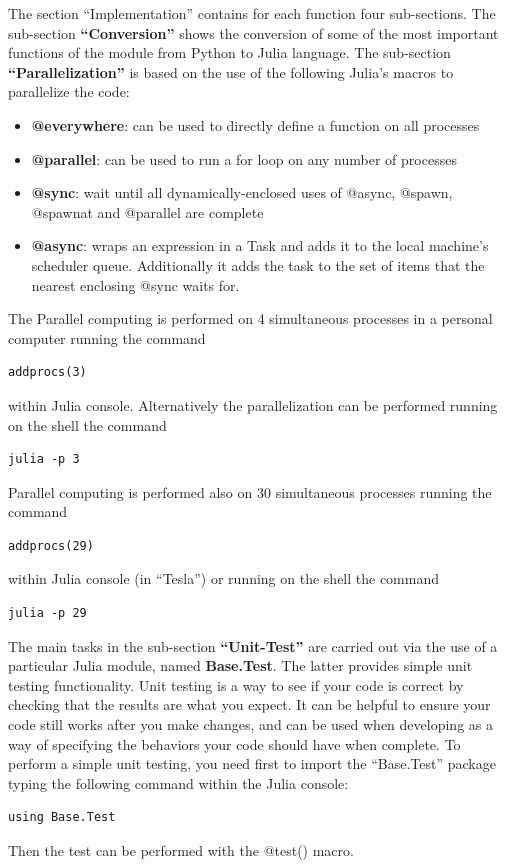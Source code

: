 \documentclass[a4paper,12pt]{article}
\begin{document}
The section ``Implementation'' contains for each function four sub-sections. 
The sub-section \textbf{``Conversion''} shows the conversion of some of the most important functions of the module
from Python to Julia language.
The sub-section \textbf{``Parallelization''} is based on the use of the following Julia's macros to
parallelize the code:
\begin{itemize}

\item \textbf{@everywhere}: can be used to directly define a function on all processes
\item \textbf{@parallel}: can be used to run a for loop on any number of processes
\item \textbf{@sync}: wait until all dynamically-enclosed uses of @async, @spawn, @spawnat and @parallel are complete
\item \textbf{@async}: wraps an expression in a Task and adds it to the local machine's scheduler
queue. Additionally it adds the task to the set of items that the nearest enclosing @sync
waits for.
\end{itemize}
The Parallel computing is performed on 4 simultaneous processes in a personal computer running the command
\begin{Verbatim}[fontsize=\footnotesize]
addprocs(3)
\end{Verbatim}
within Julia console. Alternatively the parallelization can be performed running on the shell the command
\begin{Verbatim}[fontsize=\footnotesize]
julia -p 3
\end{Verbatim}
Parallel computing is performed also on 30 simultaneous processes running the command
\begin{Verbatim}[fontsize=\footnotesize]
addprocs(29)
\end{Verbatim}
within Julia console (in ``Tesla'') or running on the shell the command
\begin{Verbatim}[fontsize=\footnotesize]
julia -p 29
\end{Verbatim}
The main tasks in the sub-section \textbf{``Unit-Test''} are carried out via the use of a particular Julia module, named \textbf{Base.Test}. The latter provides simple unit testing 
functionality. Unit testing is a way to see if your code is correct by checking that the results are what you expect.
It can be helpful to ensure your code still works after you make changes, and can be used when developing as a way of specifying the behaviors your code should have 
when complete.
To perform a simple unit testing, you need first to import the ``Base.Test'' package typing the following command within the Julia console:
\begin{Verbatim}[fontsize=\footnotesize]
using Base.Test
\end{Verbatim}
Then the test can be performed with the @test() macro.
\end{document}
